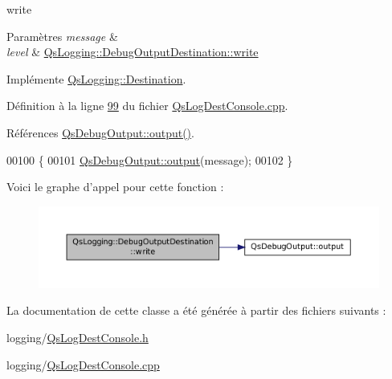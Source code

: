 write 


\begin{DoxyParams}{Paramètres}
{\em message} & \\
\hline
{\em level} & \hyperlink{classQsLogging_1_1DebugOutputDestination_a72c60cc3a3f6cb9d63dd88528b7e1125}{Qs\-Logging\-::\-Debug\-Output\-Destination\-::write} \\
\hline
\end{DoxyParams}


Implémente \hyperlink{classQsLogging_1_1Destination_a19306b28686d599f49bb23f88824fd65}{Qs\-Logging\-::\-Destination}.



Définition à la ligne \hyperlink{QsLogDestConsole_8cpp_source_l00099}{99} du fichier \hyperlink{QsLogDestConsole_8cpp_source}{Qs\-Log\-Dest\-Console.\-cpp}.



Références \hyperlink{classQsDebugOutput_a1adecc326b36497c0e6953fae87d1cb1}{Qs\-Debug\-Output\-::output()}.


\begin{DoxyCode}
00100 \{
00101     \hyperlink{classQsDebugOutput_a1adecc326b36497c0e6953fae87d1cb1}{QsDebugOutput::output}(message);
00102 \}
\end{DoxyCode}


Voici le graphe d'appel pour cette fonction \-:
\nopagebreak
\begin{figure}[H]
\begin{center}
\leavevmode
\includegraphics[width=350pt]{classQsLogging_1_1DebugOutputDestination_a72c60cc3a3f6cb9d63dd88528b7e1125_cgraph}
\end{center}
\end{figure}




La documentation de cette classe a été générée à partir des fichiers suivants \-:\begin{DoxyCompactItemize}
\item 
logging/\hyperlink{QsLogDestConsole_8h}{Qs\-Log\-Dest\-Console.\-h}\item 
logging/\hyperlink{QsLogDestConsole_8cpp}{Qs\-Log\-Dest\-Console.\-cpp}\end{DoxyCompactItemize}
